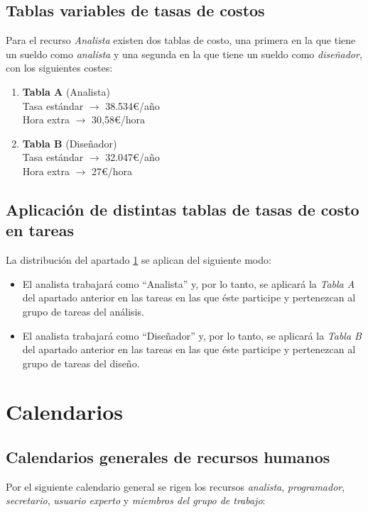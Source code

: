 \documentclass[11pt,a4paper,spanish,twoside]{book}
\begin{document}
\section{Tablas variables de tasas de costos} \label{sec:tasas}
Para el recurso \emph{Analista} existen dos tablas de costo, una primera en
la que tiene un sueldo como \emph{analista} y una segunda en la que tiene un
sueldo como \emph{diseñador}, con los siguientes costes:

\begin{enumerate}
\item \textbf{Tabla A} (Analista)
  \\Tasa estándar $\to$ 38.534\euro/año
  \\Hora extra $\to$ 30,58\euro/hora
\item \textbf{Tabla B} (Diseñador) 
  \\Tasa estándar $\to$ 32.047\euro/año
  \\Hora extra $\to$ 27\euro/hora
\end{enumerate}

\section{Aplicación de distintas tablas de tasas de costo en tareas}
La distribución del apartado \ref{sec:tasas} se aplican del siguiente modo:
\begin{itemize}
\item El analista trabajará como ``Analista'' y, por lo tanto, se aplicará la
  \emph{Tabla A} del apartado anterior en las tareas en las que éste
  participe y pertenezcan al grupo de tareas del análisis.
\item El analista trabajará como ``Diseñador'' y, por lo tanto, se aplicará
  la \emph{Tabla B} del apartado anterior en las tareas en las que éste
  participe y pertenezcan al grupo de tareas del diseño.
\end{itemize}

\chapter{Calendarios}
\section{Calendarios generales de recursos humanos}
Por el siguiente calendario general se rigen los recursos \emph{analista},
\emph{programador}, \emph{secretario}, \emph{usuario experto} y
\emph{miembros del grupo de trabajo}:
\end{document}
